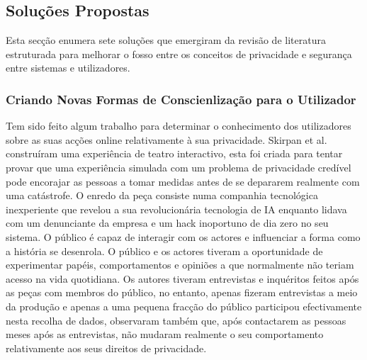 \documentclass[conference]{IEEEtran}
\begin{document}
\subsection{Soluções Propostas}

\par
Esta secção enumera sete soluções que emergiram da revisão de literatura
estruturada para melhorar o fosso entre os conceitos de privacidade e segurança
entre sistemas e utilizadores.


\subsubsection{Criando Novas Formas de Conscienlização para o Utilizador}

Tem sido feito algum trabalho para determinar o conhecimento dos utilizadores
sobre as suas acções online relativamente à sua privacidade. Skirpan et al.
\cite{SkirpanPrivacy} construíram uma experiência de teatro interactivo, esta
foi criada para tentar provar que uma experiência simulada com um problema
de privacidade credível pode encorajar as pessoas a tomar medidas antes de
se depararem realmente com uma catástrofe. O enredo da peça consiste numa
companhia tecnológica inexperiente que revelou a sua revolucionária tecnologia
de IA enquanto lidava com um denunciante da empresa e um hack inoportuno de
dia zero no seu sistema. O público é capaz de interagir com os actores e influenciar
a forma como a história se desenrola. O público e os actores tiveram a oportunidade
de experimentar papéis, comportamentos e opiniões a que normalmente não teriam
acesso na vida quotidiana. Os autores tiveram entrevistas e inquéritos feitos
após as peças com membros do público, no entanto, apenas fizeram entrevistas
a meio da produção e apenas a uma pequena fracção do público participou efectivamente
nesta recolha de dados, observaram também que, após contactarem as pessoas
meses após as entrevistas, não mudaram realmente o seu comportamento relativamente
aos seus direitos de privacidade.
\end{document}
